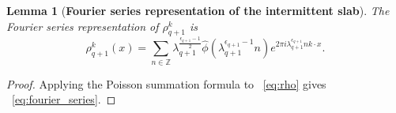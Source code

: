 \documentclass[12pt,reqno,letterpaper]{amsart}
\numberwithin{equation}{section}
\newcommand{\1}{{\bf 1}}
\newcommand{\2}{{\bf 2}}
\newcommand{\Z}{\mathbb Z}
\newtheorem{lemma}[theorem]{Lemma}
\theoremstyle{remark}
\theoremstyle{remark}
\begin{document}
\begin{lemma}[\textbf{Fourier series representation of the intermittent slab}]\label{lem:fourier}
    The Fourier series representation of $\rho_{q+1}^{k}$ is
    \begin{equation}\label{eq:fourier_series}
        \rho_{q+1}^{k}(x) = \sum_{n \in \Z} \lambda_{q+1}^{\frac{\epsilon_{q+1}-1}{2}} \hat{\phi}\left(\lambda_{q+1}^{\epsilon_{q+1}-1}n\right) e^{2\pi i \lambda_{q+1}^{\epsilon_{q+1}}  nk \cdot x}.
    \end{equation}
\end{lemma}
\begin{proof}
    Applying the Poisson summation formula to ~\eqref{eq:rho} gives ~\eqref{eq:fourier_series}.
\end{proof}
\end{document}
